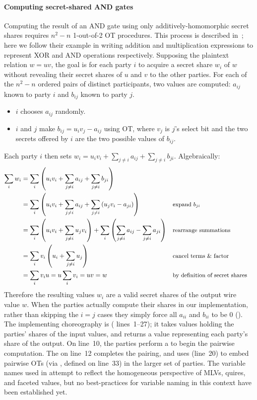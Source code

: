 \paragraph{Computing secret-shared AND gates}
Computing the result of an AND gate using only additively-homomorphic secret shares
requires $n^2-n$ 1-out-of-2 OT procedures.
This process is described in~\cite{gmwSlides};
here we follow their example in writing addition and multiplication expressions to represent XOR and AND operations respectively.
Supposing the plaintext relation $w = u v$, the goal is for each party $i$ to acquire a secret share $w_i$ of $w$
without revealing their secret shares of $u$ and $v$ to the other parties.
For each of the $n^2-n$ ordered pairs of distinct participants, two values are computed:
$a_{ij}$ known to party $i$ and $b_{ij}$ known to party $j$.
\begin{itemize}
	\item $i$ chooses $a_{ij}$ randomly.
	\item $i$ and $j$ make $b_{ij} = u_i v_j - a_{ij}$ using OT, where $v_j$ is $j$'s select bit
		and the two secrets offered by $i$ are the two possible values of $b_{ij}$.
\end{itemize}
Each party $i$ then sets $w_i = u_i v_i + \sum_{j \neq i} a_{ij} + \sum_{j \neq i} b_{ji}$.
Algebraically:
\begin{align*}
\sum_i w_i &= \sum_i \left( u_i v_i + \sum_{j \neq i} a_{ij} + \sum_{j \neq i} b_{ji} \right) \\
	   &= \sum_i \left( u_i v_i + \sum_{j \neq i} a_{ij} + \sum_{j \neq i} \left(u_j v_i - a_{ji}\right) \right)
	       && \text{\small expand $b_{ji}$} \\
	   &= \sum_i \left( u_i v_i + \sum_{j \neq i} u_j v_i \right) + \sum_i \left( \sum_{j \neq i} a_{ij} - \sum_{j \neq i} a_{ji} \right)
	       && \text{\small rearrange summations} \\
	   &= \sum_i v_i \left( u_i + \sum_{j \neq i} u_j \right)
	       && \text{\small cancel terms \& factor} \\
	   &= \sum_i v_i u = u \sum_i v_i = u v = w
	       && \text{\small by definition of secret shares}
\end{align*}
Therefore the resulting values $w_i$ are a valid secret shares of the output wire value $w$.
When the parties actually compute their shares in our implementation,
rather than skipping the $i=j$ cases they simply force all $a_{ii}$ and $b_{ii}$ to be $0$ ().
The implementing choreography is  ( lines~1--27);
it takes  values holding the parties' shares of the input values,
and returns a  value representing each party's share of the output.
On line~10, the parties perform a  to begin the pairwise computation.
The  on line~12 completes the pairing,
and uses  (line~20) to embed pairwise OTs (via , defined on line~33) in the larger set of parties.
The variable names used in  attempt to reflect the homogeneous perspective of
MLVs, quires, and faceted values,
but no best-practices for variable naming in this context have been established yet.

